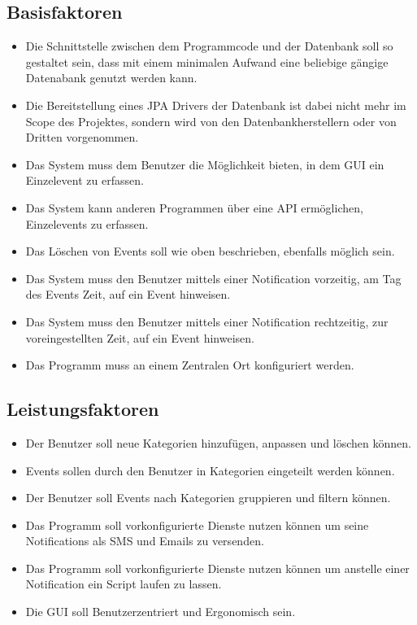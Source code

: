 \documentclass[11pt,titelpage]{scrartcl}
\begin{document}
\subsection{Basisfaktoren}
\begin{itemize}

\item Die Schnittstelle zwischen dem Programmcode und der Datenbank soll so gestaltet sein, dass mit einem minimalen
Aufwand eine beliebige gängige Datenabank genutzt werden kann.


\item
Die Bereitstellung eines JPA Drivers der Datenbank ist dabei nicht mehr im Scope des Projektes, sondern wird von den
Datenbankherstellern oder von Dritten vorgenommen.

\item
Das System muss dem Benutzer die Möglichkeit bieten, in dem GUI ein Einzelevent zu erfassen.


\item
Das System kann anderen Programmen über eine API ermöglichen, Einzelevents zu erfassen.

\item
Das Löschen von Events soll wie oben beschrieben, ebenfalls möglich sein.


\item
Das System muss den Benutzer mittels einer Notification vorzeitig, am Tag des  Events Zeit, auf ein Event hinweisen.
\item
Das System muss den Benutzer mittels einer Notification rechtzeitig, zur voreingestellten Zeit, auf ein Event hinweisen.

\item
Das Programm muss an einem Zentralen Ort konfiguriert werden.

\end{itemize}

\subsection{Leistungsfaktoren}
\begin{itemize}
\item
Der Benutzer soll neue Kategorien hinzufügen, anpassen und löschen können.
\item
Events sollen durch den Benutzer in Kategorien eingeteilt werden können.
\item
Der Benutzer soll Events nach Kategorien gruppieren und filtern können.
\item
Das Programm soll vorkonfigurierte Dienste nutzen können um seine Notifications als SMS und Emails zu versenden.
\item
Das Programm soll vorkonfigurierte Dienste nutzen können um anstelle einer Notification ein Script laufen zu lassen.
\item
Die GUI soll Benutzerzentriert und Ergonomisch sein.
\end{itemize}
\end{document}
